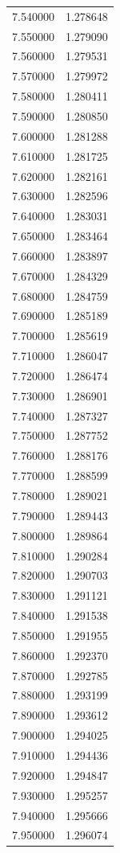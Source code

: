 \begin{tabular}{rr}
7.540000 & 1.278648 \\
7.550000 & 1.279090 \\
7.560000 & 1.279531 \\
7.570000 & 1.279972 \\
7.580000 & 1.280411 \\
7.590000 & 1.280850 \\
7.600000 & 1.281288 \\
7.610000 & 1.281725 \\
7.620000 & 1.282161 \\
7.630000 & 1.282596 \\
7.640000 & 1.283031 \\
7.650000 & 1.283464 \\
7.660000 & 1.283897 \\
7.670000 & 1.284329 \\
7.680000 & 1.284759 \\
7.690000 & 1.285189 \\
7.700000 & 1.285619 \\
7.710000 & 1.286047 \\
7.720000 & 1.286474 \\
7.730000 & 1.286901 \\
7.740000 & 1.287327 \\
7.750000 & 1.287752 \\
7.760000 & 1.288176 \\
7.770000 & 1.288599 \\
7.780000 & 1.289021 \\
7.790000 & 1.289443 \\
7.800000 & 1.289864 \\
7.810000 & 1.290284 \\
7.820000 & 1.290703 \\
7.830000 & 1.291121 \\
7.840000 & 1.291538 \\
7.850000 & 1.291955 \\
7.860000 & 1.292370 \\
7.870000 & 1.292785 \\
7.880000 & 1.293199 \\
7.890000 & 1.293612 \\
7.900000 & 1.294025 \\
7.910000 & 1.294436 \\
7.920000 & 1.294847 \\
7.930000 & 1.295257 \\
7.940000 & 1.295666 \\
7.950000 & 1.296074 \\

\end{tabular}
